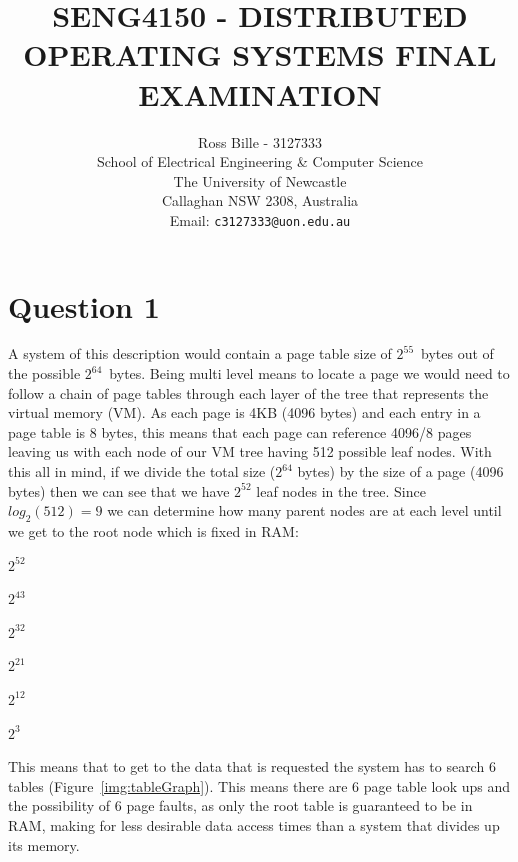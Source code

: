\documentclass[a4paper,12pt]{article}
\begin{document}
%
\title{\bf SENG4150 - DISTRIBUTED OPERATING SYSTEMS FINAL EXAMINATION}
%
\author{Ross Bille - 3127333\\
School of Electrical Engineering \& Computer Science\\
The University of Newcastle\\ Callaghan NSW 2308, Australia\\
Email: \texttt{c3127333@uon.edu.au} } 

\maketitle
\newpage
\section*{Question 1}

A system of this description would contain a page table size of $2^{55}$~bytes out of the possible $2^{64}$~bytes.
Being multi level means to locate a page we would need to follow a chain of page tables through each layer of the tree that represents the virtual memory (VM).
As each page is 4KB (4096 bytes) and each entry in a page table is 8 bytes, this means that each page can reference 4096/8 pages leaving us with each node of our VM tree having 512 possible leaf nodes.
With this all in mind, if we divide the total size ($2^{64}$ bytes) by the size of a page (4096 bytes) then we can see that we have $2^{52}$ leaf nodes in the tree.
Since $log_2(512) = 9$ we can determine how many parent nodes are at each level until we get to the root node which is fixed in RAM:
\begin{etaremune}
    \item{$2^{52}$}
    \item{$2^{43}$}
    \item{$2^{32}$}
    \item{$2^{21}$}
    \item{$2^{12}$}
    \item{$2^3$}
\end{etaremune}
This means that to get to the data that is requested the system has to search 6 tables (Figure~\ref{img:tableGraph}). 
This means there are 6 page table look ups and the possibility of 6 page faults, as only the root table is guaranteed to be in RAM, making for less desirable data access times than a system that divides up its memory.
\end{document}
